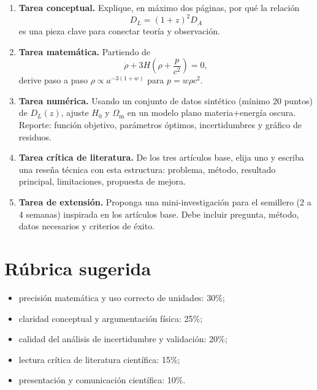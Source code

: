 \documentclass[12pt,oneside]{book}
\newcommand{\OmM}{\Omega_{\mathrm{m}}}
\begin{document}
\begin{enumerate}[leftmargin=1.5em]
  \item \textbf{Tarea conceptual.}
  Explique, en máximo dos páginas, por qué la relación
  \begin{equation*}
    D_L=(1+z)^2D_A
  \end{equation*}
  es una pieza clave para conectar teoría y observación.

  \item \textbf{Tarea matemática.}
  Partiendo de
  \begin{equation*}
    \dot\rho + 3H\left(\rho+\frac{p}{c^2}\right)=0,
  \end{equation*}
  derive paso a paso $\rho\propto a^{-3(1+w)}$ para $p=w\rho c^2$.

  \item \textbf{Tarea numérica.}
  Usando un conjunto de datos sintético (mínimo 20 puntos) de $D_L(z)$,
  ajuste $H_0$ y $\OmM$ en un modelo plano materia+energía oscura.
  Reporte: función objetivo, parámetros óptimos, incertidumbres y gráfico de residuos.

  \item \textbf{Tarea crítica de literatura.}
  De los tres artículos base, elija uno y escriba una reseña técnica con esta estructura:
  problema, método, resultado principal, limitaciones, propuesta de mejora.

  \item \textbf{Tarea de extensión.}
  Proponga una mini-investigación para el semillero (2 a 4 semanas) inspirada en
  los artículos base. Debe incluir pregunta, método, datos necesarios y criterios de éxito.
\end{enumerate}

\section{Rúbrica sugerida}
\begin{itemize}[leftmargin=1.5em]
  \item precisión matemática y uso correcto de unidades: 30\%;
  \item claridad conceptual y argumentación física: 25\%;
  \item calidad del análisis de incertidumbre y validación: 20\%;
  \item lectura crítica de literatura científica: 15\%;
  \item presentación y comunicación científica: 10\%.
\end{itemize}
\end{document}
